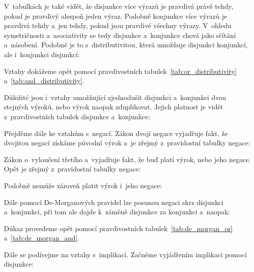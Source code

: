 V~tabulkách je také vidět, že disjunkce více výrazů je pravdivá právě tehdy, pokud je pravdivý alespoň jeden výraz. Podobně konjunkce více výrazů je pravdivá tehdy a~jen tehdy, pokud jsou pravdivé všechny výrazy. V~ohledu symetričnosti a~asociativity se tedy disjunkce a~konjunkce chová jako sčítání a~násobení. Podobně je to s~distributivitou, která umožňuje  disjunkci konjunkcí, ale i~konjunkci disjunkcí:


Vztahy dokážeme opět pomocí pravdivostních tabulek~\ref{tab:or_distributivity} a~\ref{tab:and_distributivity}.


Důležité jsou i~vztahy umožňující zjednodušit disjunkci a~konjunkci dvou stejných výroků, nebo výrok naopak zduplikovat. Jejich platnost je vidět z~pravdivostních tabulek disjunkce a~konjunkce:


Přejděme dále ke vztahům s~negací. Zákon dvojí negace vyjadřuje fakt, že dvojitou negací získáme původní výrok a~je zřejmý z~pravidostní tabulky negace:


Zákon o~vyloučení třetího a~vyjadřuje fakt, že buď platí výrok, nebo jeho negace. Opět je zřejmý z~pravidostní tabulky negace:


Podobně nemůže zároveň platit výrok i~jeho negace: 


Dále pomocí De-Morganových pravidel lze posunou negaci skrz disjunkci a~konjunkci, při tom ale dojde k~záměně disjunkce za konjunkci a~naopak:


Důkaz provedeme opět pomocí pravdivostních tabulek~\ref{tab:de_morgan_or} a~\ref{tab:de_morgan_and}.


Dále se podívejme na vztahy s~implikací. Začněme vyjádřením implikaci pomocí disjunkce:


